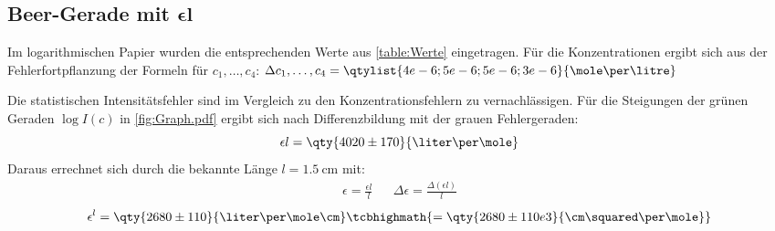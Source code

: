 \subsection[\texorpdfstring{Beer-Gerade mit \(\epsilon l\)}{Beer-Gerade mit el}]{Beer-Gerade mit \(\boldsymbol{\epsilon l}\)}
Im logarithmischen Papier wurden die entsprechenden Werte aus \cref{table:Werte} eingetragen. Für die Konzentrationen ergibt sich aus der Fehlerfortpflanzung der Formeln für \(c_1,\dots, c_4\)\autocite{Skript_1}: \(\Delta c_1,\dots, c_4=\qtylist{4e-6;5e-6;5e-6;3e-6}{\mole\per\litre}\)

Die statistischen Intensitätsfehler sind im Vergleich zu den Konzentrationsfehlern zu vernachlässigen. Für die Steigungen der grünen Geraden \(\log{I}(c)\) in \cref{fig:Graph.pdf} ergibt sich nach Differenzbildung mit der grauen Fehlergeraden:
\[\epsilon l=\qty{4020 \pm 170}{\liter\per\mole}\]
Daraus errechnet sich durch die bekannte Länge \(l=\qty{1,5}{\cm}\) mit: 
\begin{align}
  \epsilon=\frac{\epsilon l}{l}&&\Delta \epsilon=\frac{\Delta (\epsilon l)}{l}
\end{align}
\[\epsilon^{l} = \qty{2680 \pm 110}{\liter\per\mole\cm} \tcbhighmath{= \qty{2680 \pm 110 e3}{\cm\squared\per\mole}}\]

\FloatBarrier



